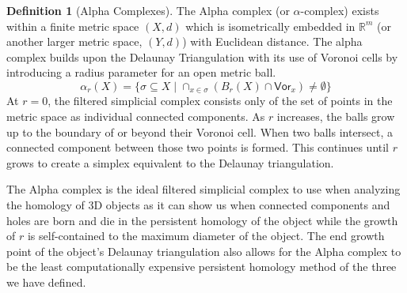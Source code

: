\documentclass[ma]{uncgdissertationexp}
\theoremstyle{plain}
\theoremstyle{definition}
\newtheorem{definition}[theorem]{Definition}
\theoremstyle{remark}
\begin{document}
\begin{definition}[Alpha Complexes]
The Alpha complex (or $\alpha$-complex) exists within a finite metric space $(X, d)$ which is isometrically embedded in $\mathbb{R}^{m}$ (or another larger metric space, $(Y, d)$) with Euclidean distance. The alpha complex builds upon the Delaunay Triangulation with its use of Voronoi cells by introducing a radius parameter for an open metric ball. 
$$\alpha_{r}(X)=\{\sigma \subseteq X \mid \cap_{x\in \sigma} (B_{r}(X) \cap \mathsf{Vor}_{x}) \not= \emptyset\}$$
At $r=0$, the filtered simplicial complex consists only of the set of points in the metric space as individual connected components. As $r$ increases, the balls grow up to the boundary of or beyond their Voronoi cell. When two balls intersect, a connected component between those two points is formed. This continues until $r$ grows to create a simplex equivalent to the Delaunay triangulation.
\end{definition}

\par The Alpha complex is the ideal filtered simplicial complex to use when analyzing the homology of 3D objects as it can show us when connected components and holes are born and die in the persistent homology of the object while the growth of $r$ is self-contained to the maximum diameter of the object. The end growth point of the object's Delaunay triangulation also allows for the Alpha complex to be the least computationally expensive persistent homology method of the three we have defined.
\end{document}
